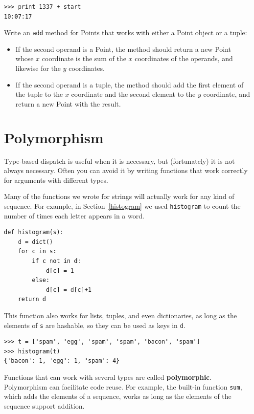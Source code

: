 \documentclass[10pt]{book}
\begin{document}
{\beforeverb
\begin{verbatim}
>>> print 1337 + start
10:07:17
\end{verbatim}
\afterverb
%

\begin{ex}
Write an {\tt add} method for Points that works with either a
Point object or a tuple:  

\begin{itemize}

\item If the second operand is a Point, the method should return a new
Point whose $x$ coordinate is the sum of the $x$ coordinates of the
operands, and likewise for the $y$ coordinates.

\item If the second operand is a tuple, the method should add the
first element of the tuple to the $x$ coordinate and the second
element to the $y$ coordinate, and return a new Point with the result. 

\end{itemize}

\end{ex}

\section{Polymorphism}

Type-based dispatch is useful when it is necessary, but (fortunately)
it is not always necessary.  Often you can avoid it by writing functions
that work correctly for arguments with different types.


Many of the functions we wrote for strings will actually
work for any kind of sequence.
For example, in Section~\ref{histogram}
we used {\tt histogram} to count the number of times each letter
appears in a word.

\beforeverb
\begin{verbatim}
def histogram(s):
    d = dict()
    for c in s:
        if c not in d:
            d[c] = 1
        else:
            d[c] = d[c]+1
    return d
\end{verbatim}
\afterverb
%
This function also works for lists, tuples, and even dictionaries,
as long as the elements of {\tt s} are hashable, so they can be used
as keys in {\tt d}.

\beforeverb
\begin{verbatim}
>>> t = ['spam', 'egg', 'spam', 'spam', 'bacon', 'spam']
>>> histogram(t)
{'bacon': 1, 'egg': 1, 'spam': 4}
\end{verbatim}
\afterverb
%
Functions that can work with several types are called {\bf polymorphic}.
Polymorphism can facilitate code reuse.  For example, the built-in
function {\tt sum}, which adds the elements of a sequence, works
as long as the elements of the sequence support addition.

}
\end{document}
